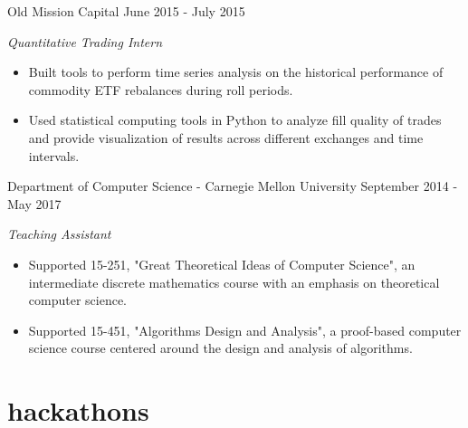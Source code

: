 \documentclass[print]{friggeri-cv} %
\begin{document}
\begin{entrylist}
{\begin{itemize}
\end{itemize}}
\entry
{Old Mission Capital}
{June 2015 - July 2015}
{\emph{Quantitative Trading Intern}
\begin{itemize}
\item Built tools to perform time series analysis on the historical performance of commodity ETF rebalances during roll periods. 
\item Used statistical computing tools in Python to analyze fill quality of trades and provide visualization of results across different exchanges and time intervals.
\end{itemize}}
\entry
{Department of Computer Science - Carnegie Mellon University}
{September 2014 - May 2017}
{\emph{Teaching Assistant}
\begin{itemize}
\item Supported 15-251,  "Great Theoretical Ideas of Computer Science", an intermediate discrete mathematics course with an emphasis on theoretical computer science.
\item Supported 15-451, "Algorithms Design and Analysis", a proof-based computer science course centered around the design and analysis of algorithms.
\end{itemize}}

\end{entrylist}


\section{hackathons}
\end{document}

